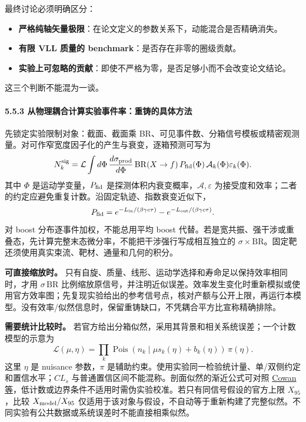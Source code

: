 \documentclass[
]{article}
\providecommand{\tightlist}{%
  \setlength{\itemsep}{0pt}\setlength{\parskip}{0pt}}
\begin{document}
最终讨论必须明确区分：

\begin{itemize}
\tightlist
\item
  \textbf{严格纯轴矢量极限}：在论文定义的参数关系下，动能混合是否精确消失。
\item
  \textbf{有限 VLL 质量的 benchmark}：是否存在非零的圈级贡献。
\item
  \textbf{实验上可忽略的贡献}：即使不严格为零，是否足够小而不会改变论文结论。
\end{itemize}

这三个判断不能混为一谈。

\paragraph{5.5.3
从物理耦合计算实验事件率：重铸的具体方法}\label{ux4eceux7269ux7406ux8026ux5408ux8ba1ux7b97ux5b9eux9a8cux4e8bux4ef6ux7387ux91cdux94f8ux7684ux5177ux4f53ux65b9ux6cd5}

先锁定实验限制对象：截面、截面乘
BR、可见事件数、分箱信号模板或精密观测量。对可作窄宽度因子化的产生与衰变，逐箱预测可写为
\[
N_k^{\rm sig}=\mathcal L\int d\Phi\,
\frac{d\sigma_{\rm prod}}{d\Phi}\,
\mathrm{BR}(X\to f)\,P_{\rm fid}(\Phi)\,
\mathcal A_k(\Phi)\varepsilon_k(\Phi).
\] 其中 \(\Phi\) 是运动学变量，\(P_{\rm fid}\)
是探测体积内衰变概率，\(\mathcal A,\varepsilon\)
为接受度和效率；二者的约定应避免重复计数。沿固定轨迹、指数衰变近似下，
\[
P_{\rm fid}=e^{-L_{\rm in}/(\beta\gamma c\tau)}
-e^{-L_{\rm out}/(\beta\gamma c\tau)}.
\] 对 boost 分布逐事件加权，不能总用平均 boost
代替。若是宽共振、强干涉或重叠态，先计算完整末态微分率，不能把干涉强行写成相互独立的
\(\sigma\times\mathrm{BR}\)。固定靶还须使用真实束流、靶材、通量和几何的积分。

\textbf{可直接缩放时。}
只有自旋、质量、线形、运动学选择和寿命足以保持效率相同时，才用
\(\sigma\,\mathrm{BR}\)
比例缩放原信号，并注明近似误差。效率发生变化时重新模拟或使用官方效率图；先复现实验给出的参考信号点，核对产额与公开上限，再运行本模型。没有效率/似然信息时，保留重铸缺口，不凭耦合平方比宣称精确排除。

\textbf{需要统计比较时。}
若官方给出分箱似然，采用其背景和相关系统误差；一个计数模型的示意为 \[
\mathscr L(\mu,\eta)=\prod_k\operatorname{Pois}
(n_k\mid\mu s_k(\eta)+b_k(\eta))\,\pi(\eta).
\] 这里 \(\eta\) 是 nuisance 参数，\(\pi\)
是辅助约束。使用实验同一检验统计量、单/双侧约定和置信水平；\(CL_s\)
与普通置信区间不能混称。剖面似然的渐近公式可对照
\href{https://arxiv.org/abs/1007.1727}{Cowan
等}，低计数或边界条件不适用时需伪实验校准。若只有同信号假设的官方上限
\(X_{95}\)，比较 \(X_{\rm model}/X_{95}\)
仅适用于该对象与假设，不自动等于重新构建了完整似然。不同实验有公共数据或系统误差时不能直接相乘似然。
\end{document}
